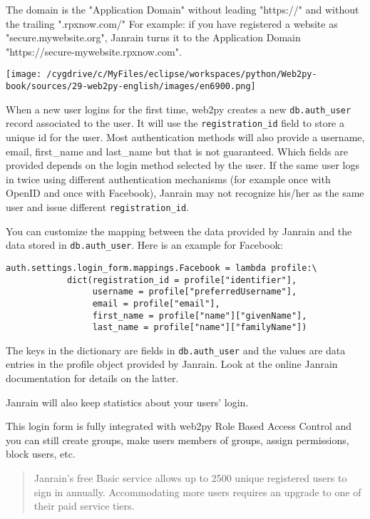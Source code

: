 \documentclass[justified,sixbynine,notoc]{tufte-book}
\def\ft{\small\tt}
\begin{document}
\begin{fullwidth}
The domain is the "Application Domain" without leading "https://" and without the trailing ".rpxnow.com/"
For example: if you have registered a website as "secure.mywebsite.org", Janrain turns it to the Application Domain "https://secure-mywebsite.rpxnow.com".


\goodbreak\begin{center}\texttt{[image: /cygdrive/c/MyFiles/eclipse/workspaces/python/Web2py-book/sources/29-web2py-english/images/en6900.png]}\end{center}


When a new user logins for the first time, web2py creates a new {\ft db.auth\_user} record associated to the user. It will use the {\ft registration\_id} field to store a unique id for the user. Most authentication methods will also provide a username, email, first\_name and last\_name but that is not guaranteed. Which fields are provided depends on the login method selected by the user. If the same user logs in twice using different authentication mechanisms (for example once with OpenID and once with Facebook), Janrain may not recognize his/her as the same user and issue different {\ft registration\_id}.

You can customize the mapping between the data provided by Janrain and the data stored in {\ft db.auth\_user}. Here is an example for Facebook:
\begin{lstlisting}
auth.settings.login_form.mappings.Facebook = lambda profile:\
            dict(registration_id = profile["identifier"],
                 username = profile["preferredUsername"],
                 email = profile["email"],
                 first_name = profile["name"]["givenName"],
                 last_name = profile["name"]["familyName"])
\end{lstlisting}

The keys in the dictionary are fields in {\ft db.auth\_user} and the values are data entries in the profile object provided by Janrain. Look at the online Janrain documentation for details on the latter.

Janrain will also keep statistics about your users' login.

This login form is fully integrated with web2py Role Based Access Control and you can still create groups, make users members of groups, assign permissions, block users, etc.

\begin{quote}Janrain's free Basic service allows up to 2500 unique registered users to sign in annually. Accommodating more users requires an upgrade to one of their paid service tiers.


\end{quote}
\end{fullwidth}
\end{document}
